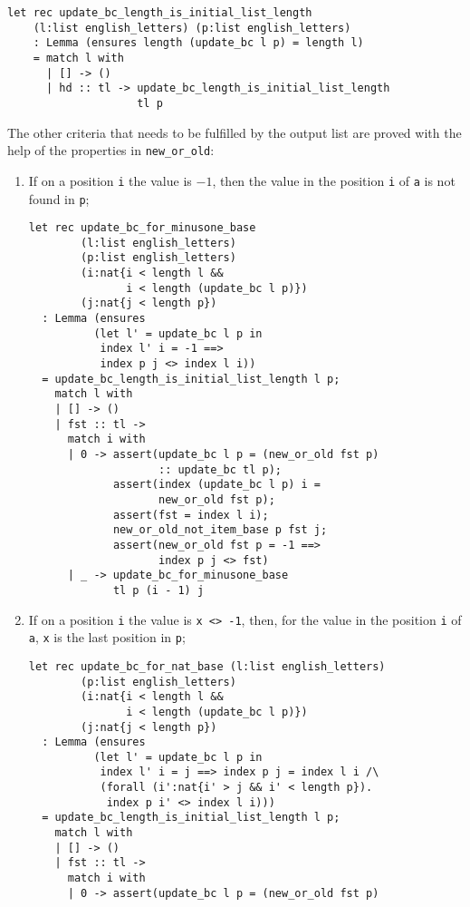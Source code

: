 \begin{verbatim}
let rec update_bc_length_is_initial_list_length
    (l:list english_letters) (p:list english_letters)
    : Lemma (ensures length (update_bc l p) = length l)
    = match l with
      | [] -> ()
      | hd :: tl -> update_bc_length_is_initial_list_length
                    tl p
\end{verbatim}

The other criteria that needs to be fulfilled by the output list are proved with the help of the properties in \texttt{new\_or\_old}:
\begin{enumerate}
\item If on a position \texttt{i} the value is \(-1\), then the value in the position \texttt{i} of \texttt{a} is not found in \texttt{p};
\begin{verbatim}
let rec update_bc_for_minusone_base 
        (l:list english_letters)
        (p:list english_letters)
        (i:nat{i < length l && 
               i < length (update_bc l p)})
        (j:nat{j < length p})
  : Lemma (ensures
          (let l' = update_bc l p in
           index l' i = -1 ==>
           index p j <> index l i))
  = update_bc_length_is_initial_list_length l p;
    match l with 
    | [] -> ()
    | fst :: tl -> 
      match i with 
      | 0 -> assert(update_bc l p = (new_or_old fst p)
                    :: update_bc tl p);
             assert(index (update_bc l p) i = 
                    new_or_old fst p);
             assert(fst = index l i);
             new_or_old_not_item_base p fst j;
             assert(new_or_old fst p = -1 ==>
                    index p j <> fst)
      | _ -> update_bc_for_minusone_base 
             tl p (i - 1) j
\end{verbatim}
\item If on a position \texttt{i} the value is \texttt{x <> -1}, then, for the value in the position \texttt{i} of \texttt{a}, \texttt{x} is the last position in \texttt{p};
\begin{verbatim}
let rec update_bc_for_nat_base (l:list english_letters)
        (p:list english_letters)
        (i:nat{i < length l &&
               i < length (update_bc l p)})
        (j:nat{j < length p})
  : Lemma (ensures 
          (let l' = update_bc l p in
           index l' i = j ==> index p j = index l i /\
           (forall (i':nat{i' > j && i' < length p}).
            index p i' <> index l i)))
  = update_bc_length_is_initial_list_length l p;
    match l with 
    | [] -> ()
    | fst :: tl ->
      match i with 
      | 0 -> assert(update_bc l p = (new_or_old fst p)

\end{verbatim}
\end{enumerate}
